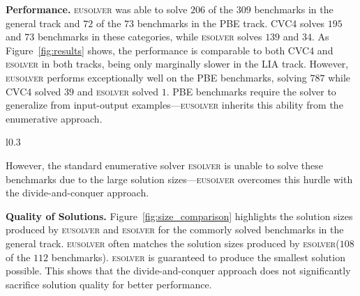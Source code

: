 \documentclass{llncs}
\newcommand{\dcsolve}{{\sffamily\fontsize{8.5}{10}\selectfont
    DCSolve}\xspace}
\renewcommand{\paragraph}[1]{\par\noindent\textbf{#1.}}
\newcommand{\esolver}{\textsc{esolver}\xspace}
\newcommand{\eusolver}{\textsc{eusolver}\xspace}
\begin{document}
\paragraph{Performance}
\eusolver was able to solve $206$ of the $309$ benchmarks in the
general track and $72$ of the $73$ benchmarks in the
PBE track.
CVC4 solves $195$ and $73$ benchmarks in these categories, while
\esolver solves $139$ and $34$.
As Figure~\ref{fig:results} shows, the performance is comparable to both
CVC4 and \esolver in both tracks, being only marginally slower in
the LIA track.
However, \eusolver performs exceptionally well on the PBE benchmarks,
solving $787$ while CVC4 solved $39$ and \esolver solved $1$.
PBE benchmarks require the solver
to generalize from input-output examples---\eusolver inherits this
ability from the enumerative approach.
\begin{wrapfigure}{l}{0.3\textwidth}%
\centering
  \caption{Scatter plot of \eusolver and \esolver solution sizes.}
    \label{fig:size_comparison}
\vspace*{-1ex}
\end{wrapfigure}
However, the standard enumerative solver \esolver is unable to solve
these benchmarks due to the large solution sizes---\eusolver overcomes
this hurdle with the divide-and-conquer approach.


\paragraph{Quality of Solutions}
Figure~\ref{fig:size_comparison} highlights the solution sizes produced by
\eusolver and \esolver  for the commorly solved benchmarks in the
general track.
\eusolver often matches the solution sizes produced by
\esolver ($108$ of the $112$ benchmarks).
\esolver is guaranteed to produce the smallest solution
possible.
This shows that the divide-and-conquer approach
does not significantly sacrifice solution quality for better
performance.
\end{document}
